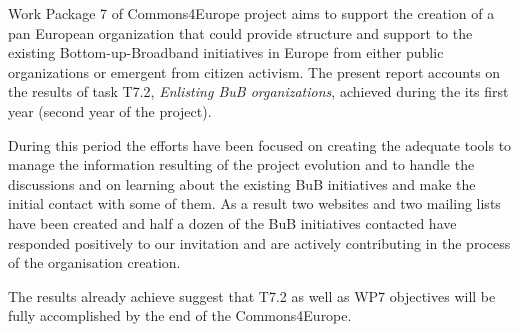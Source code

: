 Work Package 7 of Commons4Europe project aims to support the creation of a pan European organization that could provide structure and support to the existing Bottom-up-Broadband initiatives in Europe from either public organizations or emergent from citizen activism. The present report accounts on the results of task T7.2, \emph{Enlisting BuB organizations}, achieved during the its first year (second year of the project). 

During this period the efforts have been focused on creating the adequate tools to manage the information resulting of the project evolution and to handle the discussions and on learning about the existing BuB initiatives and make the initial contact with some of them. As a result two websites
and two mailing lists have been created and half a dozen of the BuB initiatives contacted have responded positively to our invitation and are actively contributing in the process of the organisation creation.

The results already achieve suggest that T7.2 as well as WP7 objectives will be fully accomplished by the end of the Commons4Europe.